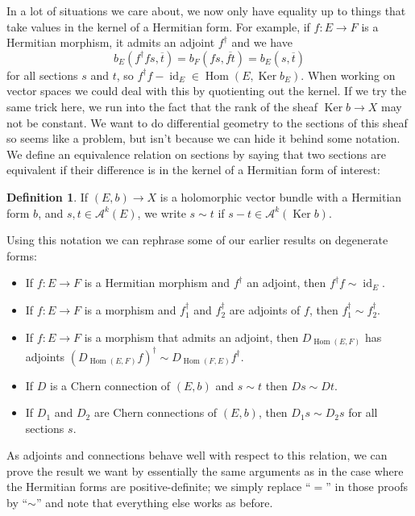 \documentclass[10pt,a4paper]{amsart}
\theoremstyle{definition}
\newtheorem{defi}[theo]{Definition}
\newcommand{\cc}[1]{\mathcal{#1}}
\def\ov#1{\overline{#1}}
\DeclareMathOperator{\Ker}{Ker}
\DeclareMathOperator{\Hom}{Hom}
\DeclareMathOperator{\id}{id}
\begin{document}
In a lot of situations we care about, we now only have equality up to things that take values in the kernel of a Hermitian form. For example, if $f : E \to F$ is a Hermitian morphism, it admits an adjoint $f^\dagger$ and we have
\[
b_E(f^\dagger f s, \ov t)
= b_F(f s, \ov{f t})
= b_E(s, \ov t)
\]
for all sections $s$ and $t$, so $f^\dagger f - \id_E \in \Hom(E, \Ker b_E)$.
When working on vector spaces we could deal with this by quotienting out the
kernel. If we try the same trick here, we run into the fact that the rank of
the sheaf $\Ker b \to X$ may not be constant. We want to do differential
geometry to the sections of this sheaf so seems like a problem, but isn't
because we can hide it behind some notation.
We define an equivalence relation on sections by saying that two sections are
equivalent if their difference is in the kernel of a Hermitian form of
interest:


\begin{defi}
If $(E, b) \to X$ is a holomorphic vector bundle with a Hermitian form $b$, and $s, t \in \cc A^k(E)$, we write
\(
s \sim t
\)
if $s - t \in \cc A^k(\Ker b)$.
\end{defi}

Using this notation we can rephrase some of our earlier results on degenerate forms:
\begin{itemize}
\item
If $f : E \to F$ is a Hermitian morphism and $f^\dagger$ an adjoint, then $f^\dagger f \sim \id_E$.

\item
If $f : E \to F$ is a morphism and $f_1^\dagger$ and $f_2^\dagger$ are adjoints of $f$, then $f_1^\dagger \sim f_2^\dagger$.

\item
If $f : E \to F$ is a morphism that admits an adjoint, then $D_{\Hom(E,F)}$ has adjoints $(D_{\Hom(E,F)}f)^\dagger \sim D_{\Hom(F,E)}f^\dagger$.

\item
If $D$ is a Chern connection of $(E,b)$ and $s \sim t$ then $Ds \sim Dt$.

\item
If $D_1$ and $D_2$ are Chern connections of $(E,b)$, then $D_1s \sim D_2s$ for all sections $s$.
\end{itemize}
As adjoints and connections behave well with respect to this relation, we can prove the result we want by essentially the same arguments as in the case where the Hermitian forms are positive-definite; we simply replace ``$=$'' in those proofs by ``$\sim$'' and note that everything else works as before.
\end{document}
